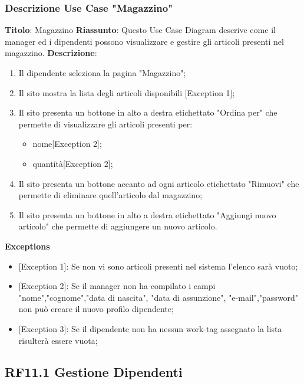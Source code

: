 \documentclass{report}
\begin{document}
\subsubsection*{Descrizione Use Case "Magazzino"}
\textbf{Titolo}: Magazzino \newline
\textbf{Riassunto}: Questo Use Case Diagram descrive come il manager ed i dipendenti possono visualizzare e gestire gli articoli presenti nel magazzino. \newline
\textbf{Descrizione}:
\begin{enumerate}
	\item Il dipendente seleziona la pagina "Magazzino";
	\item Il sito mostra la lista degli articoli disponibili [Exception 1];
	\item Il sito presenta un bottone in alto a destra etichettato "Ordina per" che permette di visualizzare gli articoli presenti per:
	\begin{itemize}
		\item nome[Exception 2];
		\item quantità[Exception 2];
	\end{itemize}
	\item Il sito presenta un bottone accanto ad ogni articolo etichettato "Rimuovi" che permette di eliminare quell'articolo dal magazzino;
	\item Il sito presenta un bottone in alto a destra etichettato "Aggiungi nuovo articolo" che permette di aggiungere un nuovo articolo.
	
\end{enumerate}
\textbf{Exceptions}
\begin{itemize}
	\item {[Exception 1]}: Se non vi sono articoli presenti nel sistema l'elenco sarà vuoto;
	\item {[Exception 2]}: Se il manager non ha compilato i campi "nome","cognome","data di nascita", "data di assunzione", "e-mail","password" non può creare il nuovo profilo dipendente;
	\item {[Exception 3]}: Se il dipendente non ha nessun work-tag assegnato la lista risulterà essere vuota;
\end{itemize}

\subsection*{RF11.1 Gestione Dipendenti}
\end{document}
